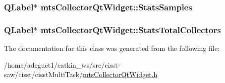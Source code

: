\hypertarget{classmts_collector_qt_widget_a3d293da33f4bca3bdc405690e63f634b}{
\subsubsection[{Stats\-Samples}]{\setlength{\rightskip}{0pt plus 5cm}Q\-Label$\ast$ mts\-Collector\-Qt\-Widget\-::\-Stats\-Samples\hspace{0.3cm}{\ttfamily [protected]}}}\label{classmts_collector_qt_widget_a3d293da33f4bca3bdc405690e63f634b}
\hypertarget{classmts_collector_qt_widget_a4f3f7becc4c3a89a36942ec8a8cc9b6c}{
\subsubsection[{Stats\-Total\-Collectors}]{\setlength{\rightskip}{0pt plus 5cm}Q\-Label$\ast$ mts\-Collector\-Qt\-Widget\-::\-Stats\-Total\-Collectors\hspace{0.3cm}{\ttfamily [protected]}}}\label{classmts_collector_qt_widget_a4f3f7becc4c3a89a36942ec8a8cc9b6c}


The documentation for this class was generated from the following file\-:\begin{DoxyCompactItemize}
\item 
/home/adeguet1/catkin\-\_\-ws/src/cisst-\/saw/cisst/cisst\-Multi\-Task/\hyperlink{mts_collector_qt_widget_8h}{mts\-Collector\-Qt\-Widget.\-h}\end{DoxyCompactItemize}

